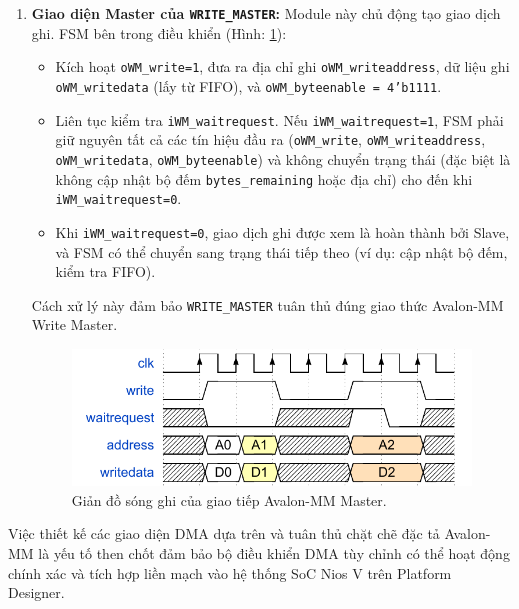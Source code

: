\begin{enumerate}
    \item \textbf{Giao diện Master của \texttt{WRITE\_MASTER}:} Module này chủ động tạo giao dịch ghi. FSM bên trong điều khiển (Hình: \ref{fig:02_06_avalon_master_write}):
        \begin{itemize}
            \item Kích hoạt \texttt{oWM\_write=1}, đưa ra địa chỉ ghi \texttt{oWM\_writeaddress}, dữ liệu ghi \texttt{oWM\_writedata} (lấy từ FIFO), và \texttt{oWM\_byteenable = 4'b1111}.
            \item Liên tục kiểm tra \texttt{iWM\_waitrequest}. Nếu \texttt{iWM\_waitrequest=1}, FSM phải giữ nguyên tất cả các tín hiệu đầu ra (\texttt{oWM\_write}, \texttt{oWM\_writeaddress}, \texttt{oWM\_writedata}, \texttt{oWM\_byteenable}) và không chuyển trạng thái (đặc biệt là không cập nhật bộ đếm \texttt{bytes\_remaining} hoặc địa chỉ) cho đến khi \texttt{iWM\_waitrequest=0}.
            \item Khi \texttt{iWM\_waitrequest=0}, giao dịch ghi được xem là hoàn thành bởi Slave, và FSM có thể chuyển sang trạng thái tiếp theo (ví dụ: cập nhật bộ đếm, kiểm tra FIFO).
        \end{itemize}
        Cách xử lý này đảm bảo \texttt{WRITE\_MASTER} tuân thủ đúng giao thức Avalon-MM Write Master.

    \begin{figure}[htbp]
        \centering
        \includegraphics[width=\linewidth]{Images/02_06_AvalonMaster_WriteWaveform.pdf}
        \caption{Giản đồ sóng ghi của giao tiếp Avalon-MM Master.}
        \label{fig:02_06_avalon_master_write}
    \end{figure}
\end{enumerate}
Việc thiết kế các giao diện DMA dựa trên và tuân thủ chặt chẽ đặc tả Avalon-MM là yếu tố then chốt đảm bảo bộ điều khiển DMA tùy chỉnh có thể hoạt động chính xác và tích hợp liền mạch vào hệ thống SoC Nios V trên Platform Designer.

